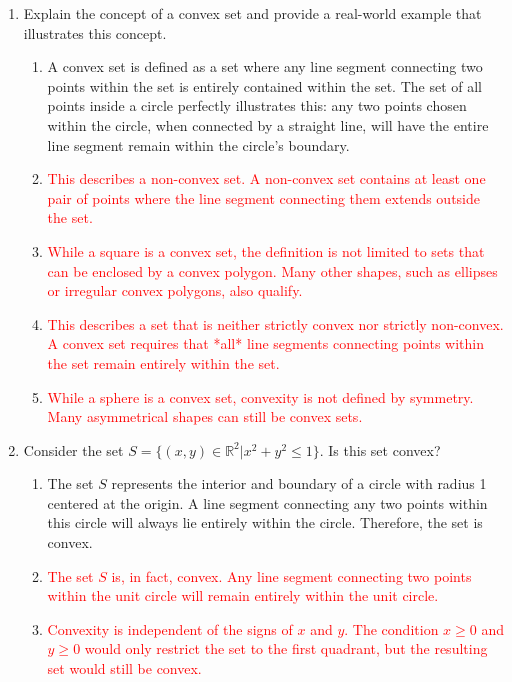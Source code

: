 \documentclass{article}%
\newcommand{\incorrect}[1]{\textcolor{red}{#1}}
\begin{document}
\begin{enumerate}
\begin{enumerate}
\item \incorrect{Convexity is fundamental to both linear and non-linear programming problems, not just integer programming.}%
\end{enumerate}%
\vspace{1em}%
\item Explain the concept of a convex set and provide a real-world example that illustrates this concept.%
\begin{enumerate}%
\item A convex set is defined as a set where any line segment connecting two points within the set is entirely contained within the set.  The set of all points inside a circle perfectly illustrates this: any two points chosen within the circle, when connected by a straight line, will have the entire line segment remain within the circle's boundary.%
\item \incorrect{This describes a non-convex set.  A non-convex set contains at least one pair of points where the line segment connecting them extends outside the set.}%
\item \incorrect{While a square is a convex set, the definition is not limited to sets that can be enclosed by a convex polygon.  Many other shapes, such as ellipses or irregular convex polygons, also qualify.}%
\item \incorrect{This describes a set that is neither strictly convex nor strictly non-convex.  A convex set requires that *all* line segments connecting points within the set remain entirely within the set.}%
\item \incorrect{While a sphere is a convex set, convexity is not defined by symmetry.  Many asymmetrical shapes can still be convex sets.}%
\end{enumerate}%
\vspace{1em}%
\item Consider the set $S = \{(x, y) \in \mathbb{R}^2 | x^2 + y^2 \le 1\}$. Is this set convex?%
\begin{enumerate}%
\item The set $S$ represents the interior and boundary of a circle with radius 1 centered at the origin.  A line segment connecting any two points within this circle will always lie entirely within the circle. Therefore, the set is convex.%
\item \incorrect{The set $S$ is, in fact, convex.  Any line segment connecting two points within the unit circle will remain entirely within the unit circle.}%
\item \incorrect{Convexity is independent of the signs of $x$ and $y$. The condition $x \ge 0$ and $y \ge 0$ would only restrict the set to the first quadrant, but the resulting set would still be convex.}%

\end{enumerate}
\end{enumerate}
\end{document}
